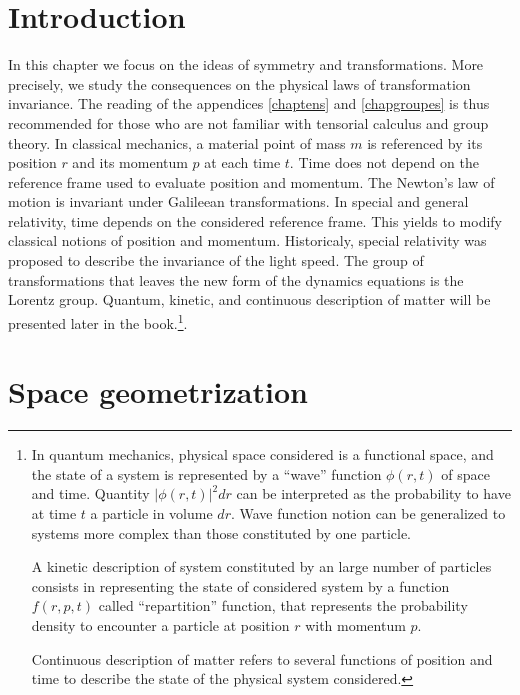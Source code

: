 \documentclass[12pt]{book}
\begin{document}
\section{Introduction}
In this chapter we focus on the ideas of symmetry and
transformations. More precisely, we study the consequences on the
physical laws of transformation invariance. The reading of the
appendices \ref{chaptens} and \ref{chapgroupes} is thus recommended
for those who are not familiar with tensorial calculus and group theory.
In classical mechanics, a material point of mass $m$ is referenced by its
position $r$ and its momentum $p$ at each time $t$. Time does not depend on the
reference frame used to evaluate position and momentum. The
Newton's law of motion is invariant under Galileean
transformations. In special and general
relativity, time depends on the considered reference frame. This yields
to modify 
classical notions of position and momentum. Historicaly, special
relativity was proposed to describe the invariance of the light speed.
The group of transformations that leaves the new form of the dynamics
equations is the Lorentz group. Quantum, kinetic, and continuous
description of matter will be presented later in the
book.\footnote{%
In quantum mechanics, physical space considered is a functional space, and the
state of a system is represented by a ``wave'' function $\phi(r,t)$ of space
and time. Quantity $|\phi(r,t)|^2dr$  can be interpreted as the probability to
have at time $t$ a particle in volume $dr$.
Wave function notion can be generalized to systems more complex than those
constituted by one particle.

A kinetic description of system constituted by an large number of particles
consists in representing the state of considered system by a function
$f(r,p,t)$ called ``repartition'' function, that represents the probability
density to encounter a particle at position  $r$ with momentum $p$.

Continuous description of matter refers to several functions of position and
time to describe the state of the physical system considered.}.%

\section{Space geometrization}
\end{document}
